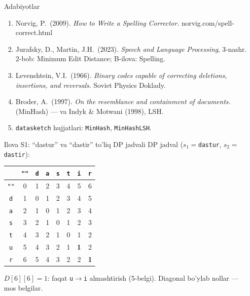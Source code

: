 \documentclass[aspectratio=169,11pt]{beamer}
\begin{document}
\begin{frame}{Adabiyotlar}
  \begin{enumerate}\small\setlength\itemsep{5pt}
    \item Norvig, P.\ (2009). \textit{How to Write a Spelling Corrector.}
          norvig.com/spell-correct.html
    \item Jurafsky, D., Martin, J.H.\ (2023). \textit{Speech and Language
          Processing}, 3-nashr. 2-bob: Minimum Edit Distance; B-ilova: Spelling.
    \item Levenshtein, V.I.\ (1966). \textit{Binary codes capable of
          correcting deletions, insertions, and reversals.} Soviet Physics Doklady.
    \item Broder, A.\ (1997). \textit{On the resemblance and containment of
          documents.} (MinHash) --- va Indyk \& Motwani (1998), LSH.
    \item \texttt{datasketch} hujjatlari: \texttt{MinHash}, \texttt{MinHashLSH}.
  \end{enumerate}
\end{frame}

\appendix

\begin{frame}{Ilova S1: ``dastur'' va ``dastir'' to'liq DP jadvali}
  \small DP jadval ($s_1=$\texttt{dastur}, $s_2=$\texttt{dastir}):
  \begin{center}\footnotesize
  \begin{tabular}{c|ccccccc}
     & \texttt{""} & \texttt{d} & \texttt{a} & \texttt{s} & \texttt{t} & \texttt{i} & \texttt{r} \\
    \hline
    \texttt{""} & 0 & 1 & 2 & 3 & 4 & 5 & 6 \\
    \texttt{d}  & 1 & 0 & 1 & 2 & 3 & 4 & 5 \\
    \texttt{a}  & 2 & 1 & 0 & 1 & 2 & 3 & 4 \\
    \texttt{s}  & 3 & 2 & 1 & 0 & 1 & 2 & 3 \\
    \texttt{t}  & 4 & 3 & 2 & 1 & 0 & 1 & 2 \\
    \texttt{u}  & 5 & 4 & 3 & 2 & 1 & \textbf{1} & 2 \\
    \texttt{r}  & 6 & 5 & 4 & 3 & 2 & 2 & \textbf{1} \\
  \end{tabular}
  \end{center}
  \vspace{3pt}
  \footnotesize $D[6][6]=1$: faqat \texttt{u}$\to$\texttt{i} almashtirish
  (5-belgi). Diagonal bo'ylab nollar --- mos belgilar.
\end{frame}
\end{document}
